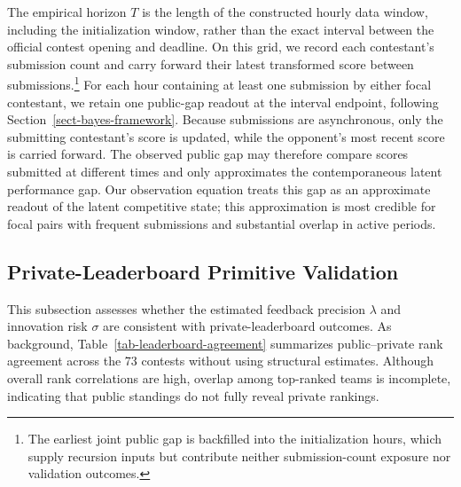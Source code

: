 \documentclass[mnsc]{informs3}
\begin{document}
The empirical horizon $T$ is the length of the constructed hourly data window, including the initialization window, rather than the exact interval between the official contest opening and deadline. On this grid, we record each contestant's submission count and carry forward their latest transformed score between submissions.\footnote{The earliest joint public gap is backfilled into the initialization hours, which supply recursion inputs but contribute neither submission-count exposure nor validation outcomes.} For each hour containing at least one submission by either focal contestant, we retain one public-gap readout at the interval endpoint, following Section~\ref{sect-bayes-framework}.
Because submissions are asynchronous, only the submitting contestant’s score is updated, while the opponent’s most recent score is carried forward.
The observed public gap may therefore compare scores submitted at different times and only approximates the contemporaneous latent performance gap.
Our observation equation treats this gap as an approximate readout of the latent competitive state; this approximation is most credible for focal pairs with frequent submissions and substantial overlap in active periods.



\subsection{Private-Leaderboard Primitive Validation}\label{sect-validation}

{This subsection assesses whether the estimated feedback precision $\lambda$ and innovation risk $\sigma$ are consistent with private-leaderboard outcomes. As background, Table~\ref{tab-leaderboard-agreement} summarizes public--private rank agreement across the 73 contests without using structural estimates. Although overall rank correlations are high, overlap among top-ranked teams is incomplete, indicating that public standings do not fully reveal private rankings.}
\end{document}
